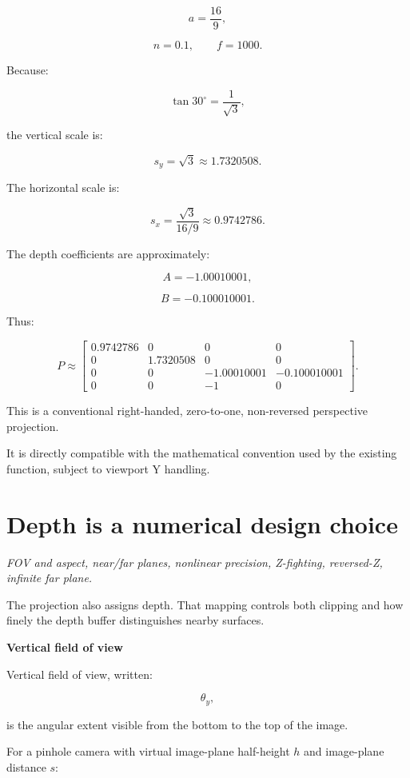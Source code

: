 \[
 a=\frac{16}{9},
\]

\[
 n=0.1,\qquad f=1000.
\]

Because:

\[
 \tan30^\circ=\frac1{\sqrt3},
\]

the vertical scale is:

\[
 s_y=\sqrt3\approx1.7320508.
\]

The horizontal scale is:

\[
 s_x=\frac{\sqrt3}{16/9} \approx0.9742786.
\]

The depth coefficients are approximately:

\[
 A=-1.00010001,
\]

\[
 B=-0.100010001.
\]

Thus:

\[
 \boxed{ P\approx \begin{bmatrix} 0.9742786&0&0&0\\ 0&1.7320508&0&0\\ 0&0&-1.00010001&-0.100010001\\ 0&0&-1&0 \end{bmatrix} }.
\]

This is a conventional right-handed, zero-to-one, non-reversed perspective projection.

It is directly compatible with the mathematical convention used by the existing  function, subject to viewport Y handling.

\section{Depth is a numerical design choice}\label{02-foundations-ii-ch033-depth-is-a-numerical-design-choice}

\hypertarget{02-foundations-ii-ch033-depth-is-a-numerical-design-choice}{}

\emph{FOV and aspect, near/far planes, nonlinear precision, Z-fighting, reversed-Z, infinite far plane.}

The projection also assigns depth. That mapping controls both clipping and how finely the depth buffer distinguishes nearby surfaces.

\textbf{Vertical field of view}

Vertical field of view, written:

\[
 \boxed{\theta_y},
\]

is the angular extent visible from the bottom to the top of the image.

For a pinhole camera with virtual image-plane half-height \(h\) and image-plane distance \(s\):

